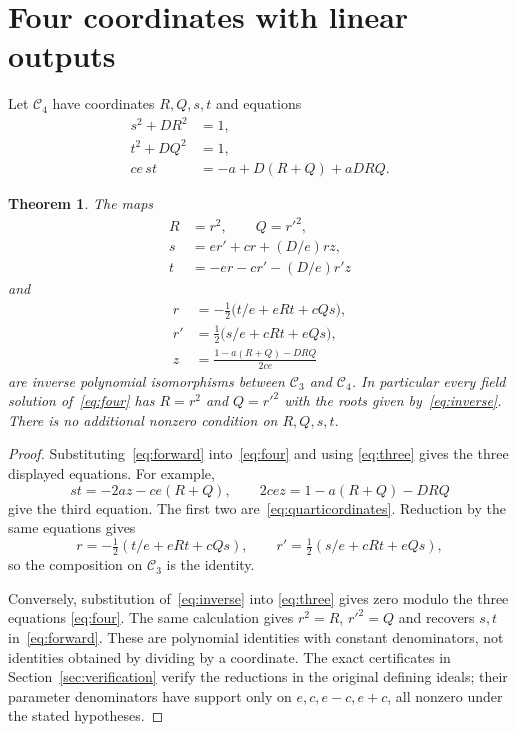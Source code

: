 \documentclass[11pt,a4paper]{article}
\newtheorem{theorem}{Theorem}[section]
\begin{document}
\section{Four coordinates with linear outputs}
Let $\mathcal C_4$ have coordinates $R,Q,s,t$ and equations
\begin{equation}\label{eq:four}
 \begin{split}
 s^2+DR^2&=1,\\
 t^2+DQ^2&=1,\\
 ce\,st&=-a+D(R+Q)+aDRQ.
 \end{split}
\end{equation}

\begin{theorem}\label{thm:isomorphism}
The maps
\begin{equation}\label{eq:forward}
 \begin{split}
 R&=r^2,\qquad Q=r'^2,\\
 s&=er'+cr+(D/e)rz,\\
 t&=-er-cr'-(D/e)r'z
 \end{split}
\end{equation}
and
\begin{equation}\label{eq:inverse}
 \begin{split}
 r&=-\tfrac12\bigl(t/e+eRt+cQs\bigr),\\
 r'&=\tfrac12\bigl(s/e+cRt+eQs\bigr),\\
 z&=\frac{1-a(R+Q)-DRQ}{2ce}
 \end{split}
\end{equation}
are inverse polynomial isomorphisms between $\mathcal C_3$ and
$\mathcal C_4$. In particular every field solution of~\eqref{eq:four}
has $R=r^2$ and $Q=r'^2$ with the roots given by~\eqref{eq:inverse}.
There is no additional nonzero condition on $R,Q,s,t$.
\end{theorem}
\begin{proof}
Substituting~\eqref{eq:forward} into~\eqref{eq:four} and using
\eqref{eq:three} gives the three displayed equations. For example,
\[
 st=-2az-ce(R+Q),\qquad
 2cez=1-a(R+Q)-DRQ
\]
give the third equation. The first two are~\eqref{eq:quarticordinates}.
Reduction by the same equations gives
\[
 r=-\tfrac12(t/e+eRt+cQs),\qquad
 r'=\tfrac12(s/e+cRt+eQs),
\]
so the composition on $\mathcal C_3$ is the identity.

Conversely, substitution of~\eqref{eq:inverse} into
\eqref{eq:three} gives zero modulo the three equations
\eqref{eq:four}. The same calculation gives
$r^2=R$, $r'^2=Q$ and recovers $s,t$ in~\eqref{eq:forward}.
These are polynomial identities with constant denominators, not
identities obtained by dividing by a coordinate. The exact certificates
in Section~\ref{sec:verification} verify the reductions in the original
defining ideals; their parameter denominators have support only on
$e,c,e-c,e+c$, all nonzero under the stated hypotheses.
\end{proof}
\end{document}

